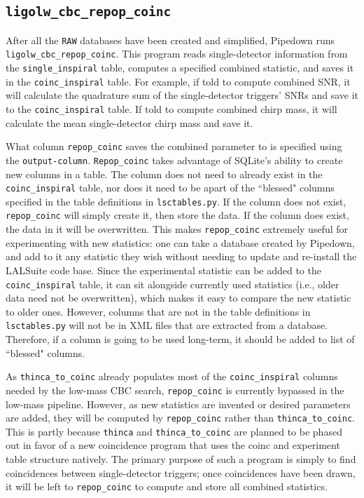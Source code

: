 \subsection{ \texttt{ligolw\_cbc\_repop\_coinc} }
\label{sec:repop_coinc}

After all the \verb|RAW| databases have been created and simplified, Pipedown
runs \\ \verb|ligolw_cbc_repop_coinc|. This program reads single-detector
information from the \verb|single_inspiral| table, computes a specified
combined statistic, and saves it in the \verb|coinc_inspiral| table. For
example, if told to compute combined \ac{SNR}, it will calculate the quadrature
sum of the single-detector triggers' \acp{SNR} and save it to the
\verb|coinc_inspiral| table. If told to compute combined chirp mass, it will
calculate the mean single-detector chirp mass and save it.

What column \verb|repop_coinc| saves the combined parameter to is specified
using the \verb|output-column|. \verb|Repop_coinc| takes advantage of SQLite's
ability to create new columns in a table. The column does not need to already
exist in the \verb|coinc_inspiral| table, nor does it need to be apart of the
``blessed" columns specified in the table definitions in \verb|lsctables.py|.
If the column does not exist, \verb|repop_coinc| will simply create it, then
store the data. If the column does exist, the data in it will be overwritten.
This makes \verb|repop_coinc| extremely useful for experimenting with new
statistics: one can take a database created by Pipedown, and add to it any
statistic they wish without needing to update and re-install the LALSuite code
base. Since the experimental statistic can be added to the
\verb|coinc_inspiral| table, it can sit alongside currently used statistics
(i.e., older data need not be overwritten), which makes it easy to compare the
new statistic to older ones. However, columns that are not in the table
definitions in \verb|lsctables.py| will not be in XML files that are extracted
from a database. Therefore, if a column is going to be used long-term, it
should be added to list of ``blessed" columns.

As \verb|thinca_to_coinc| already populates most of the \verb|coinc_inspiral|
columns needed by the low-mass \ac{CBC} search, \verb|repop_coinc| is currently
bypassed in the low-mass pipeline. However, as new statistics are invented or
desired parameters are added, they will be computed by \verb|repop_coinc|
rather than \verb|thinca_to_coinc|. This is partly because \verb|thinca| and
\verb|thinca_to_coinc| are planned to be phased out in favor of a new
coincidence program that uses the coinc and experiment table structure
natively. The primary purpose of such a program is simply to find coincidences
between single-detector triggers; once coincidences have been drawn, it will be
left to \verb|repop_coinc| to compute and store all combined statistics.


